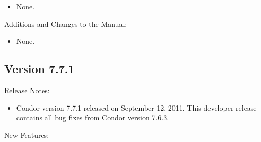 \begin{itemize}

\item None.

\end{itemize}

\noindent Additions and Changes to the Manual:

\begin{itemize}

\item None.

\end{itemize}


\subsection*{\label{sec:New-7-7-1}Version 7.7.1}

\noindent Release Notes:

\begin{itemize}

\item Condor version 7.7.1 released on September 12, 2011.
This developer release contains all bug fixes from Condor version 7.6.3.

\end{itemize}


\noindent New Features:

